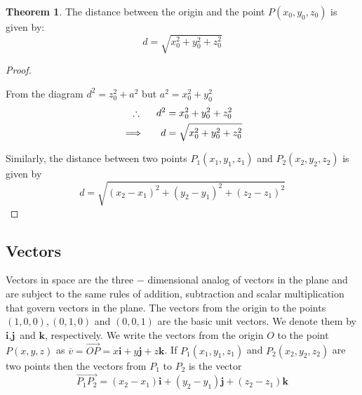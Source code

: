 \documentclass[11pt,a4paper]{article}
\theoremstyle{definition}
\newtheorem{thm}{Theorem}[subsection]
\begin{document}
\begin{thm}


The distance between the origin and the point $P(x_0,y_0,z_0)$ is given by: $$d = \sqrt{x_0^2 + y_0^2 + z_0^2}$$
\end{thm}

\begin{proof}



\begin{figure}[H]
\centering
{}
\end{figure}

From the diagram $d^2 = z_0^2 + a^2$ but $a^2 = x_0^2 + y_0^2$
\begin{align*}
\therefore\hspace{0.5cm} d^2 & = x_0^2 + y_0^2 + z_0^2\\
\implies \hspace{0.5cm} d & = \sqrt{x_0^2 + y_0^2 + z_0^2}\\
\end{align*}

Similarly, the distance between two points $P_1(x_1,y_1,z_1)$ and $P_2(x_2,y_2,z_2)$ is given by $$d = \sqrt{(x_2 - x_1)^2 +  (y_2 - y_1)^2 + (z_2 - z_1)^2             }$$

\pagebreak
\end{proof}
\subsection{Vectors}
Vectors in space are the three $-$ dimensional analog of vectors in the plane and are subject to the same rules of addition, subtraction and scalar multiplication that govern vectors in the plane. The vectors from the origin to the points $(1,0,0) , (0,1,0)$ and $(0,0,1)$ are the basic unit vectors. We denote them by $\textbf{i}, \textbf{j}$ and $\textbf{k}$, respectively. We write the vectors from the origin $O$ to the point $P(x,y,z)$ as $\overline{v} = \overrightarrow{OP} = x\textbf{i} + y\textbf{j} + z\textbf{k}$. If $P_1(x_1,y_1,z_1)$ and $P_2(x_2,y_2,z_2)$ are two points then the vectors from $P_1$ to $P_2$  is the vector $$\overrightarrow{P_1P_2} = (x_2 - x_1)\textbf{i} +  (y_2 - y_1)\textbf{j} +  (z_2 - z_1)\textbf{k}$$
\end{document}
